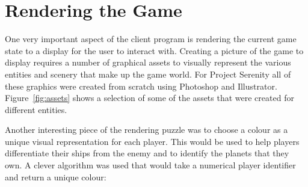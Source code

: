 \section{Rendering the Game}


% 
% 
% 
% 

One very important aspect of the client program is rendering the current game state to a display for the user to interact with. Creating a picture of the game to display requires a number of graphical assets to visually represent the various entities and scenery that make up the game world. For Project Serenity all of these graphics were created from scratch using Photoshop and Illustrator. Figure~\ref{fig:assets} shows a selection of some of the assets that were created for different entities.


Another interesting piece of the rendering puzzle was to choose a colour as a unique visual representation for each player. This would be used to help players differentiate their ships from the enemy and to identify the planets that they own. A clever algorithm was used that would take a numerical player identifier and return a unique colour:\cite{ankerl2009}

